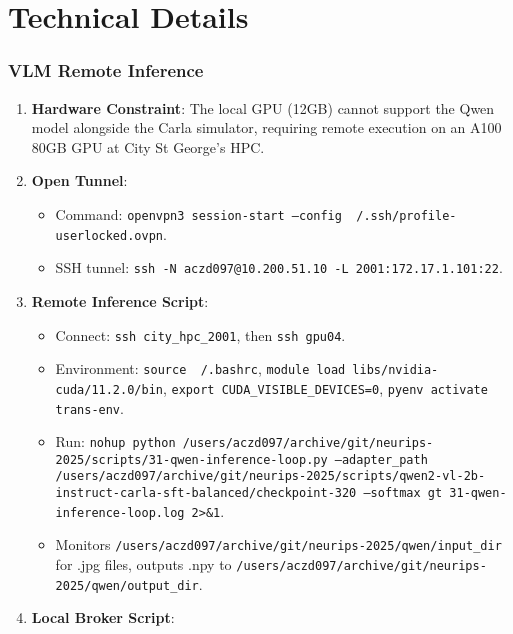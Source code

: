 
\chapter{Technical Details}

\label{Appendix-Technical-Details} %


\subsection{VLM Remote Inference}
\label{app:vlm_remote_inference}

\begin{enumerate}
    \item \textbf{Hardware Constraint}: The local GPU (12GB) cannot support the Qwen model alongside the Carla simulator, requiring remote execution on an A100 80GB GPU at City St George’s HPC.
    \item \textbf{Open Tunnel}:
    \begin{itemize}
        \item Command: \texttt{openvpn3 session-start --config \string~/.ssh/profile-userlocked.ovpn}.
        \item SSH tunnel: \texttt{ssh -N aczd097@10.200.51.10 -L 2001:172.17.1.101:22}.
    \end{itemize}
    \item \textbf{Remote Inference Script}:
    \begin{itemize}
        \item Connect: \texttt{ssh city\_hpc\_2001}, then \texttt{ssh gpu04}.
        \item Environment: \texttt{source \string~/.bashrc}, \texttt{module load libs/nvidia-cuda/11.2.0/bin}, \texttt{export CUDA\_VISIBLE\_DEVICES=0}, \texttt{pyenv activate trans-env}.
        \item Run: \texttt{nohup python /users/aczd097/archive/git/neurips-2025/scripts/31-qwen-inference-loop.py --adapter\_path /users/aczd097/archive/git/neurips-2025/scripts/qwen2-vl-2b-instruct-carla-sft-balanced/checkpoint-320 --softmax gt 31-qwen-inference-loop.log 2>\&1}.
        \item Monitors \texttt{/users/aczd097/archive/git/neurips-2025/qwen/input\_dir} for .jpg files, outputs .npy to \texttt{/users/aczd097/archive/git/neurips-2025/qwen/output\_dir}.
    \end{itemize}
    \item \textbf{Local Broker Script}:

\end{enumerate}
